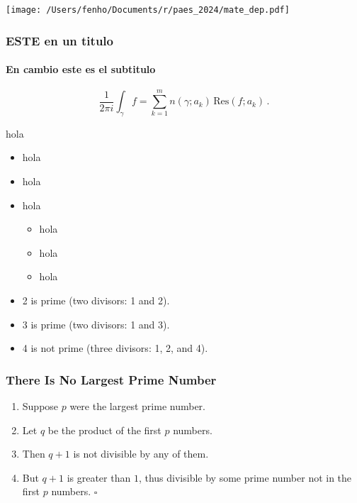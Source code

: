 \documentclass[tema claro]{presentacion}
\begin{document}
\begin{frame}

\texttt{[image: /Users/fenho/Documents/r/paes\_2024/mate\_dep.pdf]}%

\end{frame}


\begin{frame}
\frametitle{ESTE en un titulo}
\framesubtitle{En cambio este es el subtitulo}
\begin{equation*}
  \frac{1}{2\pi i}\int_\gamma\! f = \sum_{k=1}^m
  n(\gamma;a_k)\,\text{Res}(f;a_k)\,.
\end{equation*}
\end{frame}

\begin{frame}{hola}

\begin{itemize}
  \item hola
  \item hola
  \item hola
  \begin{itemize}
    \item hola
    \item hola
    \item hola

  \end{itemize}

\end{itemize}

\end{frame}

\begin{frame}

\begin{itemize}
\item 2 is prime (two divisors: 1 and 2).
\pause
\item 3 is prime (two divisors: 1 and 3).
\pause
\item 4 is not prime (\alert{three} divisors: 1, 2, and 4).
\end{itemize}

\end{frame}

\begin{frame}
  \frametitle{There Is No Largest Prime Number}

  \begin{enumerate}
  \item<1-> Suppose $p$ were the largest prime number.
  \item<2-> Let $q$ be the product of the first $p$ numbers.
  \item<3-> Then $q + 1$ is not divisible by any of them.
  \item<1-> But $q + 1$ is greater than $1$, thus divisible by some prime
  number not in the first $p$ numbers. $\square$
  \end{enumerate}
\end{frame}
\end{document}
